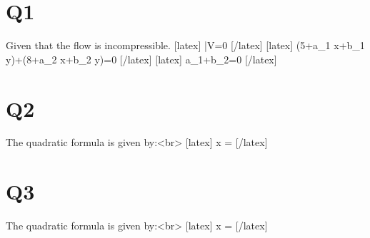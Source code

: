 \section*{Q1}
Given that the flow is incompressible.
[latex] \therefore \quad {} \bar{V}=0 [/latex]
[latex] \left(5+a_{1} x+b_{1} y\right)+\left(8+a_{2} x+b_{2} y\right)=0 [/latex]
[latex] a_{1}+b_{2}=0 [/latex]

\section*{Q2}
The quadratic formula is given by:<br>
[latex] x =  [/latex]

\section*{Q3}
The quadratic formula is given by:<br>
[latex] x =  [/latex]
